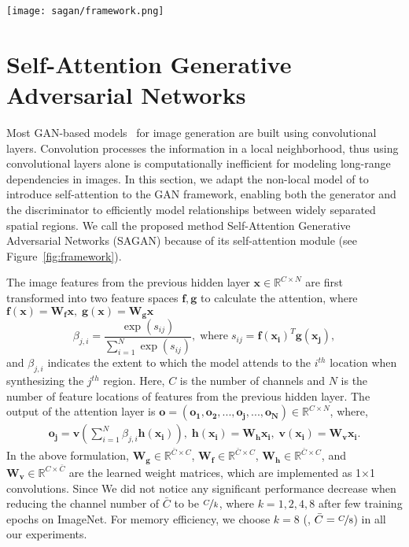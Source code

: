 \documentclass{article}
\begin{document}
\begin{figure*}[tb]
\centering
\texttt{[image: sagan/framework.png]}
\caption{The proposed self-attention module for the SAGAN. The $\otimes$ denotes matrix multiplication. The softmax operation is performed on each row.}
\label{fig:framework}
\end{figure*}



\section{Self-Attention Generative Adversarial Networks} \label{sec:sagan_sagan} 

Most GAN-based models~\cite{Radford15, Salimans2016, KarrasALL18} for image generation are built using convolutional layers. Convolution processes the information in a local neighborhood, thus using convolutional layers alone is computationally inefficient for modeling long-range dependencies in images.
In this section, we adapt the non-local model of \cite{Wang18} to introduce self-attention to the GAN framework, enabling both the generator and the discriminator to efficiently model relationships between widely separated spatial regions. We call the proposed method Self-Attention Generative Adversarial Networks (SAGAN) because of its self-attention module (see Figure~\ref{fig:framework}).


The image features from the previous hidden layer  $\bm{x} \in \mathbb{R}^{C \times N}$ are first transformed into two feature spaces $\bm{f}, \bm{g}$ to calculate the attention, where $\bm{f({x})}=\bm{W_f}\bm{x}, \; \bm{g({x})}=\bm{{W_g}{x}}$
\begin{equation}\label{eq:attention}
\beta_{j, i} = \frac{\exp (s_{ij})}{\sum_{i=1}^{N} \exp(s_{ij})},\; \text{where} \; s_{ij}= \bm{f}(\bm{x_i})^T \bm{g}(\bm{x_j}),
\end{equation}
and $\beta_{j, i}$ indicates the extent to which the model attends to the $i^{th}$ location when synthesizing the $j^{th}$ region. Here, $C$ is the number of channels and $N$ is the number of feature locations of features from the previous hidden layer.
The output of the attention layer is $\bm{o} = (\bm{o_1}, \bm{o_2}, ..., \bm{o_j}, ..., \bm{o_N}) \in \mathbb{R}^{C \times N}$, where,
\begin{equation}\label{eq:attention_out}
\begin{split}
\bm{o_j} = \bm{v}\left(\sum_{i=1}^{N} \beta_{j, i} \bm{h}(\bm{x_i})\right), \; \bm{h}(\bm{x_i})=\bm{{W_h}{x_i}}, \;  \bm{v}(\bm{x_i})=\bm{{W_v}{x_i}}.
\end{split}
\end{equation}
In the above formulation, $\bm{W_g} \in \mathbb{R}^{\bar{C} \times C}$, $\bm{W_f} \in \mathbb{R}^{\bar{C} \times C}$, $\bm{W_h} \in \mathbb{R}^{\bar{C} \times C}$, and $\bm{W_v} \in \mathbb{R}^{C \times \bar{C}}$ are the learned weight matrices, which are implemented as  1$\times$1 convolutions. 
Since We did not notice any significant performance decrease when reducing the channel number of $\bar{C}$ to be $\nicefrac{C}{k}$, where $k=1, 2, 4, 8$ after few training epochs on ImageNet. For memory efficiency, we choose $k=8$ (\ie, $\bar{C} = \nicefrac{C}{8}$) in all our experiments. 
\end{document}
